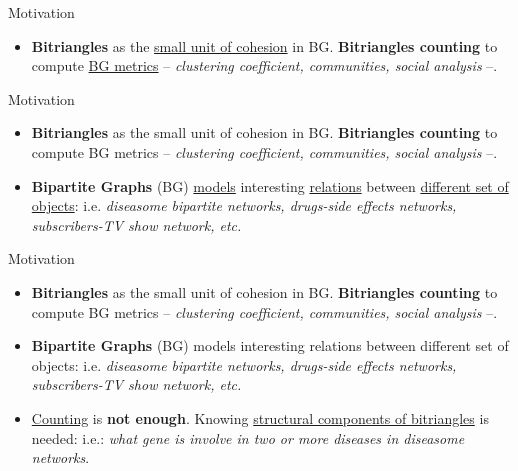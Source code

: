 \begin{frame}[fragile]{Motivation}
  \begin{itemize}
    \item \textbf{Bitriangles} as the \underline{\color{red}small unit of cohesion} in BG. \textbf{Bitriangles counting} to compute \underline{\color{red}BG metrics} -- \emph{clustering coefficient, communities, social analysis} --.
  \end{itemize}
\end{frame}

\begin{frame}[fragile]{Motivation}
  \begin{itemize}
    \setlength\itemsep{2em}
    \item {\color{light}\textbf{Bitriangles} as the small unit of cohesion in BG. \textbf{Bitriangles counting} to compute BG metrics -- \emph{clustering coefficient, communities, social analysis} --.}
    \item \textbf{Bipartite Graphs} (BG) \underline{\color{red}models} interesting \underline{\color{red}relations} between \underline{\color{red}different set of objects}: i.e. \emph{diseasome bipartite networks, drugs-side effects networks, subscribers-TV show network, etc.}
  \end{itemize}
\end{frame}

\begin{frame}[fragile]{Motivation}
  \begin{itemize}
    \setlength\itemsep{2em}
    \item {\color{light}\textbf{Bitriangles} as the small unit of cohesion in BG. \textbf{Bitriangles counting} to compute BG metrics -- \emph{clustering coefficient, communities, social analysis} --.}
    \item {\color{light}\textbf{Bipartite Graphs} (BG) models interesting relations between different set of objects: i.e. \emph{diseasome bipartite networks, drugs-side effects networks, subscribers-TV show network, etc.}}
    \item \underline{\color{red}Counting} is \textbf{not enough}. Knowing \underline{\color{red}structural components of bitriangles} is needed: i.e.: \emph{what gene is involve in two or more diseases in diseasome networks}.
  \end{itemize}
\end{frame}

